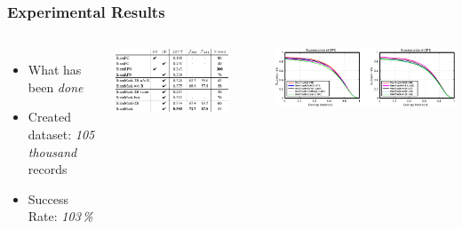 
\begin{frame}
  \frametitle{Experimental Results}
  \begin{columns}
    \begin{itemize}
      \item What has been \emph{done}
      \item Created dataset: \emph{105\,thousand} records
      \item Success Rate: \emph{103\,\%}
    \end{itemize}

    \centering
    \includegraphics[width=0.8\textwidth]{img/template-ResultsTable.pdf}

    \bigskip
    \includegraphics[width=\textwidth]{img/template-ResultsPlot.pdf}

  \end{columns}
\end{frame}


